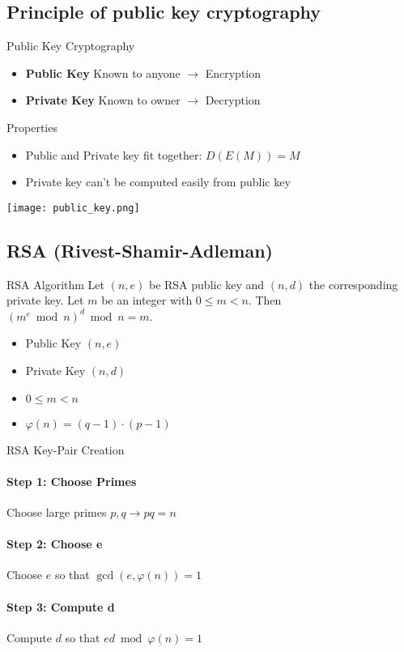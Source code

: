 \subsection{Principle of public key cryptography}

\begin{definition}{Public Key Cryptography}
    \begin{itemize}
        \item \textbf{Public Key} Known to anyone $\rightarrow$ Encryption
        \item \textbf{Private Key} Known to owner $\rightarrow$ Decryption
    \end{itemize}
\end{definition}

\begin{concept}{Properties}
    \begin{itemize}
        \item Public and Private key fit together: $D(E(M)) = M$
        \item Private key can't be computed easily from public key
    \end{itemize}
\end{concept}

\texttt{[image: public\_key.png]}

\subsection{RSA (Rivest-Shamir-Adleman)}

\begin{definition}{RSA Algorithm}
    Let $(n, e)$ be RSA public key and $(n, d)$ the corresponding private key. Let $m$ be an integer with $0 \leq m < n$. Then $(m^e \bmod n)^d \bmod n = m$.
    \begin{itemize}
        \item Public Key $(n, e)$
        \item Private Key $(n, d)$
        \item $0 \leq m < n$
        \item $\varphi(n) = (q - 1) \cdot (p - 1)$
    \end{itemize}
\end{definition}

\begin{KR}{RSA Key-Pair Creation}
    \paragraph{Step 1: Choose Primes}
    Choose large primes $p, q \rightarrow pq = n$
    
    \paragraph{Step 2: Choose e}
    Choose $e$ so that $\gcd(e,\varphi(n)) = 1$
    
    \paragraph{Step 3: Compute d}
    Compute $d$ so that $ed \bmod \varphi(n) = 1$
\end{KR}

